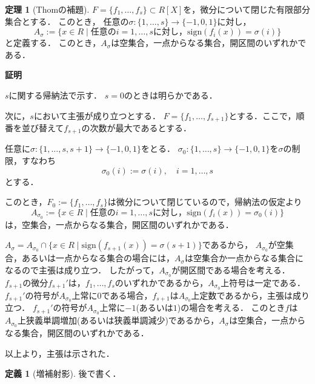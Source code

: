 \documentclass[uplatex, dvipdfmx]{jsarticle}
\makeatletter
\renewenvironment{proof}[1][\proofname]{\par
  \pushQED{\qed}%
  \normalfont \topsep6\p@\@plus6\p@\relax
  \trivlist
  \item\relax
  {\bfseries
  #1\@addpunct{.}}\hspace\labelsep\ignorespaces
}{%
  \popQED\endtrivlist\@endpefalse
}
\newcommand{\sign}{\mathrm{sign}}
\newcommand{\map}[3]{{#1}:{#2}\rightarrow{#3}}
\theoremstyle{definition}
\newtheorem{definition}{定義}[section]
\newtheorem{theorem}{定理}[section]
\renewcommand{\proofname}{\textbf{証明}}
\makeatother
\begin{document}
\begin{theorem}[Thomの補題]
     $F = \{f_1, \dots, f_s\} \subset R[X]$を，微分について閉じた有限部分集合とする．
     このとき， 任意の$\map{\sigma}{\{1, \dots, s\}}{\{-1,0,1\}}$に対し，
     \[
          A_\sigma := \{x \in R \mid \text{任意の$i=1, \dots, s$に対し，} \sign(f_i(x)) = \sigma(i)\}
     \]
     と定義する．
     このとき，$A_\sigma$は空集合，一点からなる集合，開区間のいずれかである．
\end{theorem}

\begin{proof}
     $s$に関する帰納法で示す．
     $s = 0$のときは明らかである．
     
     次に，$s$において主張が成り立つとする．
     $F = \{f_1, \dots, f_{s+1}\}$とする．ここで，順番を並び替えて$f_{s+1}$の次数が最大であるとする．

     任意に$\map{\sigma}{\{1, \dots, s, s+1\}}{\{-1,0,1\}}$をとる．
     $\map{\sigma_0}{\{1, \dots, s\}}{\{-1,0,1\}}$を$\sigma$の制限，すなわち
     \[
          \sigma_0(i) := \sigma(i), \quad i=1, \dots, s
     \]
     とする．

     このとき，$F_0 := \{f_1, \dots, f_{s}\}$は微分について閉じているので，帰納法の仮定より
     \[
          A_{\sigma_0}:=\{x \in R \mid \text{任意の$i=1, \dots, s$に対し，} \sign(f_i(x)) = \sigma_0(i)\}
     \]
     は，空集合，一点からなる集合，開区間のいずれかである．

     $A_\sigma = A_{\sigma_0} \cap \{x \in R \mid \sign(f_{s+1}(x)) = \sigma(s+1)\}$であるから，
     $A_{\sigma_0}$が空集合，あるいは一点からなる集合の場合には，$A_\sigma$は空集合か一点からなる集合になるので主張は成り立つ．
     したがって，$A_{\sigma_0}$が開区間である場合を考える．
     $f_{s+1}$の微分$f_{s+1}'$は，$f_1, \dots, f_s$のいずれかであるから，$A_{\sigma_0}$上符号は一定である．
     $f_{s+1}'$の符号が$A_{\sigma_0}$上常に$0$である場合，$f_{s+1}$は$A_{\sigma_0}$上定数であるから，主張は成り立つ．
     $f_{s+1}'$の符号が$A_{\sigma_0}$上常に$-1$(あるいは$1$)の場合を考える．
     このとき$f$は$A_{\sigma_0}$上狭義単調増加(あるいは狭義単調減少)であるから，$A_{\sigma}$は空集合，一点からなる集合，開区間のいずれかである．

     以上より，主張は示された．
\end{proof}

\begin{definition}[増補射影]
     後で書く．

\end{definition}
\end{document}
